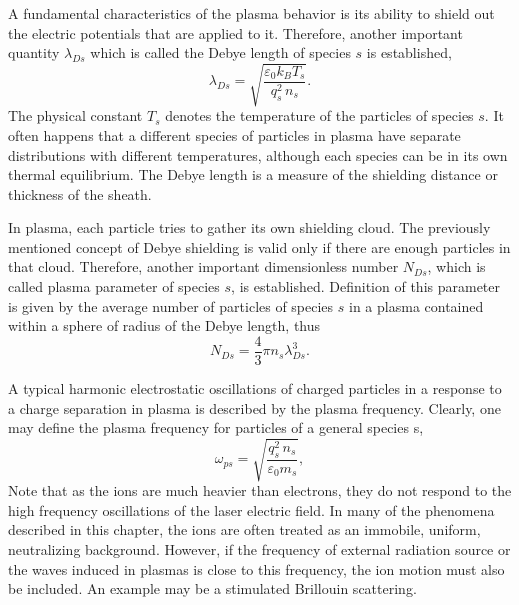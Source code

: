 A fundamental characteristics of the plasma behavior is its ability to shield out the electric potentials that are applied to it. Therefore, another important quantity $ \lambda_{Ds} $ which is called the Debye length of species $ s $ is established,
\begin{equation}
\label{2.1.3}
\lambda_{Ds} = \sqrt{\frac{\varepsilon_0 k_B T_s}{q_s^2 \, n_s}}.
\end{equation}
The physical constant $ T_s $ denotes the temperature of the particles of species $ s $. It often happens that a different species of particles in plasma have separate distributions with different temperatures, although each species can be in its own thermal equilibrium. The Debye length is a measure of the shielding distance or thickness of the sheath.

In plasma, each particle tries to gather its own shielding cloud. The previously mentioned concept of Debye shielding is valid only if there are enough particles in that cloud. Therefore, another important dimensionless number $ N_{Ds} $, which is called plasma parameter of species $ s $, is established. Definition of this parameter is given by the average number of particles of species $ s $ in a plasma contained within a sphere of radius of the Debye length, thus
\begin{equation}
\label{2.1.4}
N_{Ds} = \frac{4}{3} \pi n_s \lambda_{Ds}^3. 
\end{equation}

A typical harmonic electrostatic oscillations of charged particles in a response to a charge separation in plasma is described by the plasma frequency. Clearly, one may define the plasma frequency for particles of a general species s, 
\begin{equation}
\label{2.1.5}
\omega_{ps} = \sqrt{\frac{q_s^{2}\,n_s}{\varepsilon_0 m_s}},
\end{equation}
Note that as the ions are much heavier than electrons, they do not respond to the high frequency oscillations of the laser electric field. In many of the phenomena described in this chapter, the ions are often treated as an immobile, uniform, neutralizing background. However, if the frequency of external radiation source or the waves induced in plasmas is close to this frequency, the ion motion must also be included. An example may be a stimulated Brillouin scattering.

